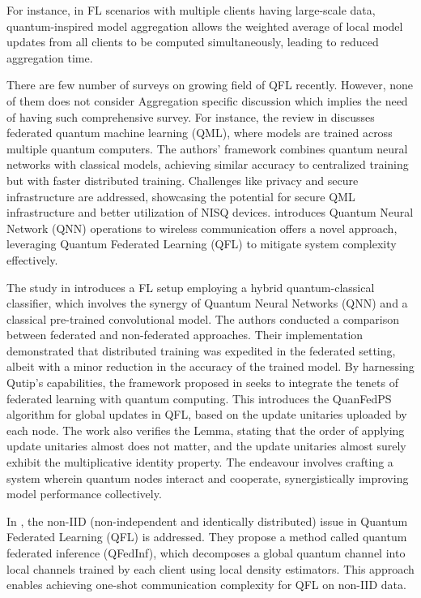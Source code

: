 For instance, in FL scenarios with multiple clients having large-scale data, quantum-inspired model aggregation allows the weighted average of local model updates from all clients to be computed simultaneously, leading to reduced aggregation time.

There are few number of surveys on growing field of QFL recently.
However, none of them does not consider Aggregation specific discussion which implies the need of having such comprehensive survey.
For instance, the review in \cite{chen2021federated} discusses federated quantum machine learning (QML), where models are trained across multiple quantum computers. The authors' framework combines quantum neural networks with classical models, achieving similar accuracy to centralized training but with faster distributed training. Challenges like privacy and secure infrastructure are addressed, showcasing the potential for secure QML infrastructure and better utilization of NISQ devices.
\cite{pujahari2022quantum} introduces Quantum Neural Network (QNN) operations to wireless communication offers a novel approach, leveraging Quantum Federated Learning (QFL) to mitigate system complexity effectively.


The study in \cite{chen2021federated} introduces a FL setup employing a hybrid quantum-classical classifier, which involves the synergy of Quantum Neural Networks (QNN) and a classical pre-trained convolutional model. The authors conducted a comparison between federated and non-federated approaches. Their implementation demonstrated that distributed training was expedited in the federated setting, albeit with a minor reduction in the accuracy of the trained model.
By harnessing Qutip's capabilities, the framework proposed in \cite{xia2021quantumfed} seeks to integrate the tenets of federated learning with quantum computing.
This introduces the QuanFedPS algorithm for global updates in QFL, based on the update unitaries uploaded by each node. The work also verifies the Lemma, stating that the order of applying update unitaries almost does not matter, and the update unitaries almost surely exhibit the multiplicative identity property.
The endeavour involves crafting a system wherein quantum nodes interact and cooperate, synergistically improving model performance collectively.

In \cite{zhao2023nonQFLinf}, the non-IID (non-independent and identically distributed) issue in Quantum Federated Learning (QFL) is addressed. They propose a method called quantum federated inference (QFedInf), which decomposes a global quantum channel into local channels trained by each client using local density estimators. This approach enables achieving one-shot communication complexity for QFL on non-IID data.

